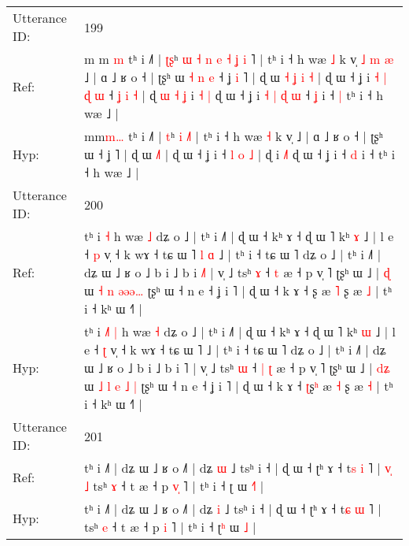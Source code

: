 \documentclass[10pt]{article}
\DeclareRobustCommand{\hl}[1]{{\textcolor{red}{#1}}}
\begin{document}
\begin{longtable}{ll}
 \\
\midrule
Utterance ID: & 199 \\
Ref: & m\hl{ }m\hl{ }\hl{m} tʰ i ˩˥ | \hl{ʈ}\hl{ʂ}ʰ\hl{ }\hl{ɯ}\hl{ }\hl{˧}\hl{ }\hl{n}\hl{ }\hl{e}\hl{ }\hl{˧} \hl{ʝ} \hl{i}\hl{ }˥ | tʰ i ˧ h wæ \hl{˩} k v̩\hl{ }\hl{˩}\hl{ }\hl{m}\hl{ }\hl{æ} ˩ | ɑ ˩ ʁ o ˧ | ʈʂʰ ɯ\hl{ }\hl{˧}\hl{ }\hl{n}\hl{ }\hl{e} ˧ ʝ\hl{ }\hl{i} ˥ | ɖ ɯ\hl{ }\hl{˧}\hl{ }\hl{ʝ} \hl{i}\hl{ }\hl{˧} | ɖ ɯ ˧ ʝ i\hl{ }\hl{˧}\hl{ }\hl{|}\hl{ }\hl{ɖ}\hl{ }\hl{ɯ} ˧ \hl{ʝ} \hl{i} \hl{˧} | ɖ\hl{ }\hl{ɯ}\hl{ }\hl{˧}\hl{ }\hl{ʝ} i \hl{˧}\hl{ }\hl{|} ɖ ɯ ˧ ʝ i\hl{ }\hl{˧}\hl{ }\hl{|}\hl{ }\hl{ɖ}\hl{ }\hl{ɯ} ˧ \hl{ʝ} i ˧\hl{ }\hl{|} tʰ i ˧ h wæ ˩ |
 \\
Hyp: & m\hl{}m\hl{m}\hl{…} tʰ i ˩˥ | \hl{}\hl{t}ʰ\hl{}\hl{}\hl{}\hl{}\hl{}\hl{}\hl{}\hl{}\hl{}\hl{} \hl{i} \hl{}\hl{˩}˥ | tʰ i ˧ h wæ \hl{˧} k v̩\hl{}\hl{}\hl{}\hl{}\hl{}\hl{} ˩ | ɑ ˩ ʁ o ˧ | ʈʂʰ ɯ\hl{}\hl{}\hl{}\hl{}\hl{}\hl{} ˧ ʝ\hl{}\hl{} ˥ | ɖ ɯ\hl{}\hl{}\hl{}\hl{} \hl{}\hl{˩}\hl{˥} | ɖ ɯ ˧ ʝ i\hl{}\hl{}\hl{}\hl{}\hl{}\hl{}\hl{}\hl{} ˧ \hl{l} \hl{o} \hl{˩} | ɖ\hl{}\hl{}\hl{}\hl{}\hl{}\hl{} i \hl{}\hl{˩}\hl{˥} ɖ ɯ ˧ ʝ i\hl{}\hl{}\hl{}\hl{}\hl{}\hl{}\hl{}\hl{} ˧ \hl{d} i ˧\hl{}\hl{} tʰ i ˧ h wæ ˩ |
 \\
\midrule
Utterance ID: & 200 \\
Ref: & tʰ i\hl{}\hl{}\hl{} \hl{˧} h wæ \hl{˩} dʑ o ˩ | tʰ i ˩˥ | ɖ ɯ ˧ kʰ ɤ ˧ ɖ ɯ ˥ kʰ \hl{ɤ} ˩ | l e ˧ \hl{p} v̩ ˧ k wɤ ˧ tɕ ɯ ˥\hl{ }\hl{l}\hl{ }\hl{ɑ} ˩ | tʰ i ˧ tɕ ɯ ˥ dʑ o ˩ | tʰ i ˩˥ | dʑ ɯ ˩ ʁ o ˩ b i ˩ b i \hl{˩}˥ | v̩ ˩ tsʰ \hl{ɤ} ˧\hl{}\hl{} \hl{t} æ ˧ p v̩ ˥ ʈʂʰ ɯ ˩ | \hl{}\hl{ɖ} ɯ \hl{˧} \hl{n} \hl{}\hl{ə}\hl{ə}\hl{ə}\hl{…} ʈʂʰ ɯ ˧ n e ˧ ʝ i ˥ | ɖ ɯ ˧ k ɤ ˧ \hl{}ʂ\hl{} æ \hl{˥} ʂ æ \hl{˩} | tʰ i ˧ kʰ ɯ ˧˥ |
 \\
Hyp: & tʰ i\hl{ }\hl{˩}\hl{˥} \hl{|} h wæ \hl{˧} dʑ o ˩ | tʰ i ˩˥ | ɖ ɯ ˧ kʰ ɤ ˧ ɖ ɯ ˥ kʰ \hl{ɯ} ˩ | l e ˧ \hl{ʈ} v̩ ˧ k wɤ ˧ tɕ ɯ ˥\hl{}\hl{}\hl{}\hl{} ˩ | tʰ i ˧ tɕ ɯ ˥ dʑ o ˩ | tʰ i ˩˥ | dʑ ɯ ˩ ʁ o ˩ b i ˩ b i \hl{}˥ | v̩ ˩ tsʰ \hl{ɯ} ˧\hl{ }\hl{|} \hl{ʈ} æ ˧ p v̩ ˥ ʈʂʰ ɯ ˩ | \hl{d}\hl{ʑ} ɯ \hl{˩} \hl{l} \hl{e}\hl{ }\hl{˩}\hl{ }\hl{|} ʈʂʰ ɯ ˧ n e ˧ ʝ i ˥ | ɖ ɯ ˧ k ɤ ˧ \hl{ʈ}ʂ\hl{ʰ} æ \hl{˧} ʂ æ \hl{˧} | tʰ i ˧ kʰ ɯ ˧˥ |
 \\
\midrule
Utterance ID: & 201 \\
Ref: & tʰ i ˩˥ | dʑ ɯ ˩ ʁ o ˩˥ | dʑ \hl{ɯ} ˩ tsʰ i ˧ | ɖ ɯ ˧ ʈʰ ɤ ˧ t\hl{s} \hl{i} ˥ |\hl{ }\hl{v}\hl{̩}\hl{ }\hl{˩} tsʰ \hl{ɤ} ˧ t æ ˧ p \hl{v}\hl{̩} ˥ | tʰ i ˧ ʈ\hl{} ɯ \hl{˧}\hl{˥} |
 \\
Hyp: & tʰ i ˩˥ | dʑ ɯ ˩ ʁ o ˩˥ | dʑ \hl{i} ˩ tsʰ i ˧ | ɖ ɯ ˧ ʈʰ ɤ ˧ t\hl{ɕ} \hl{ɯ} ˥ |\hl{}\hl{}\hl{}\hl{}\hl{} tsʰ \hl{e} ˧ t æ ˧ p \hl{}\hl{i} ˥ | tʰ i ˧ ʈ\hl{ʰ} ɯ \hl{}\hl{˩} |

\end{longtable}
\end{document}
